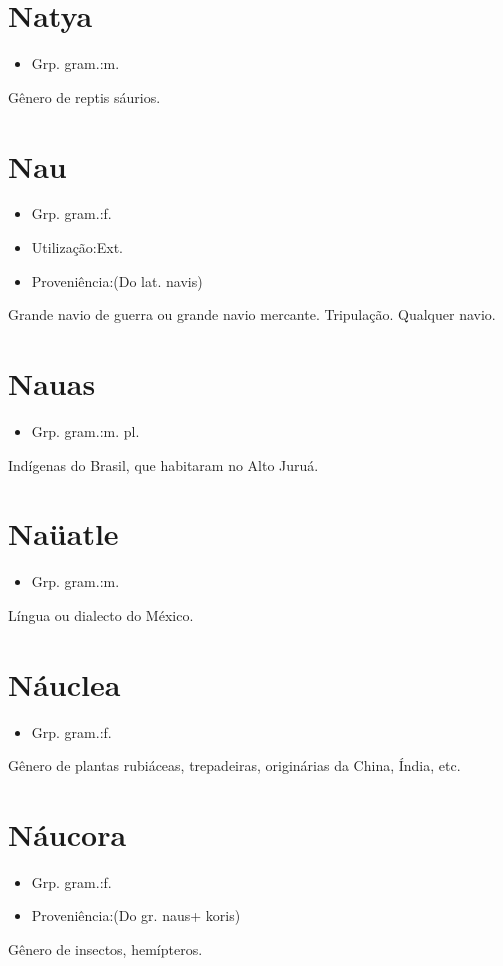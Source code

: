 \section{Natya}
\begin{itemize}
\item {Grp. gram.:m.}
\end{itemize}
Gênero de reptis sáurios.
\section{Nau}
\begin{itemize}
\item {Grp. gram.:f.}
\end{itemize}
\begin{itemize}
\item {Utilização:Ext.}
\end{itemize}
\begin{itemize}
\item {Proveniência:(Do lat. \textunderscore navis\textunderscore )}
\end{itemize}
Grande navio de guerra ou grande navio mercante.
Tripulação.
Qualquer navio.
\section{Nauas}
\begin{itemize}
\item {Grp. gram.:m. pl.}
\end{itemize}
Indígenas do Brasil, que habitaram no Alto Juruá.
\section{Naüatle}
\begin{itemize}
\item {Grp. gram.:m.}
\end{itemize}
Língua ou dialecto do México.
\section{Náuclea}
\begin{itemize}
\item {Grp. gram.:f.}
\end{itemize}
Gênero de plantas rubiáceas, trepadeiras, originárias da China, Índia, etc.
\section{Náucora}
\begin{itemize}
\item {Grp. gram.:f.}
\end{itemize}
\begin{itemize}
\item {Proveniência:(Do gr. \textunderscore naus\textunderscore  + \textunderscore koris\textunderscore )}
\end{itemize}
Gênero de insectos, hemípteros.
